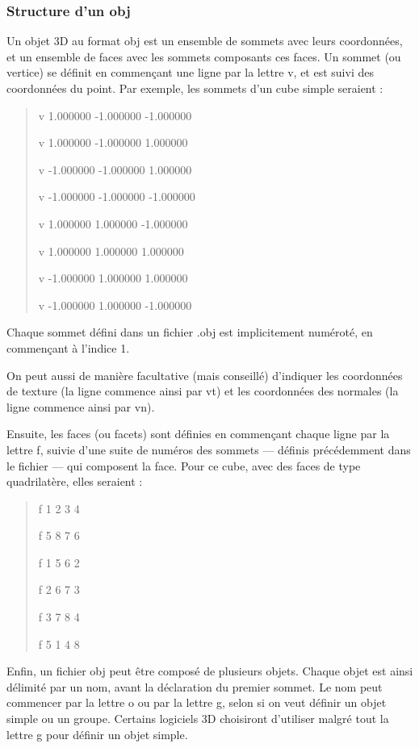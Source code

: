 \documentclass[a4paper,french]{report}
\begin{document}
				\subsubsection{Structure d'un obj}
				Un objet 3D au format obj est un ensemble de sommets avec leurs coordonnées, et un ensemble de faces avec les sommets composants ces faces. Un sommet (ou vertice) se définit en commençant une ligne par la lettre v, et est suivi des coordonnées du point. Par exemple, les sommets d'un cube simple seraient : 
				\begin{quotation}
					v 1.000000 -1.000000 -1.000000 \par 
					v 1.000000 -1.000000 1.000000 \par
					v -1.000000 -1.000000 1.000000 \par
					v -1.000000 -1.000000 -1.000000 \par
					v 1.000000 1.000000 -1.000000 \par
					v 1.000000 1.000000 1.000000 \par
					v -1.000000 1.000000 1.000000 \par
					v -1.000000 1.000000 -1.000000
				\end{quotation} \par
				Chaque sommet défini dans un fichier .obj est implicitement numéroté, en commençant à l'indice 1. \par
				On peut aussi de manière facultative (mais conseillé) d'indiquer les coordonnées de texture (la ligne commence ainsi par vt) et les coordonnées des normales (la ligne commence ainsi par vn). \par
				Ensuite, les faces (ou facets) sont définies en commençant chaque ligne par la lettre f, suivie d'une suite de numéros des sommets --- définis précédemment dans le fichier --- qui composent la face. Pour ce cube, avec des faces de type quadrilatère, elles seraient : 
				\begin{quotation}
					f 1 2 3 4 \par
					f 5 8 7 6 \par
					f 1 5 6 2 \par
					f 2 6 7 3 \par
					f 3 7 8 4 \par
					f 5 1 4 8
				\end{quotation} \par
				Enfin, un fichier obj peut être composé de plusieurs objets. Chaque objet est ainsi délimité par un nom, avant la déclaration du premier sommet. Le nom peut commencer par la lettre o ou par la lettre g, selon si on veut définir un objet simple ou un groupe. Certains logiciels 3D choisiront d'utiliser malgré tout la lettre g pour définir un objet simple.
				
\end{document}
